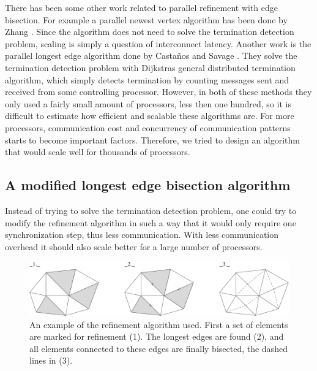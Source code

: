There has been some other work related to parallel refinement with
edge bisection. For example a parallel newest vertex algorithm has
been done by Zhang \cite{Zhang2005}. Since the algorithm does not need
to solve the termination detection problem, scaling is simply a
question of interconnect latency. Another work is the parallel longest
edge algorithm done by Casta\~nos and Savage \cite{CastanosSavage1999}. They
solve the termination detection problem with Dijkstras general
distributed termination algorithm, which simply detects termination by
counting messages sent and received from some controlling
processor. However, in both of these methods they only used a fairly
small amount of processors, less then one hundred, so it is difficult
to estimate how efficient and scalable these algorithms are. For more
processors, communication cost and concurrency of communication
patterns starts to become important factors. Therefore, we tried to
design an algorithm that would scale well for thousands of processors.



\subsection{A modified longest edge bisection algorithm}
\label{hoffman-4:sect:modlong}

Instead of trying to solve the termination detection problem, one
could try to modify the refinement algorithm in such a way that it
would only require one synchronization step, thus less
communication. With less communication overhead it should also scale
better for a large number of processors.

\begin{figure}[htb]
  \begin{center}
    \includegraphics[width=1.0\columnwidth]{chapters/hoffman-4/pdf/mref.pdf}
    \caption{An example of the refinement algorithm
      used. First a set of elements are marked for refinement (1). The
      longest edges are found (2), and all elements connected to these
      edges are finally bisected, the dashed lines in (3).}
    \label{hoffman-4:fig:bisectexample}
  \end{center}
\end{figure}

